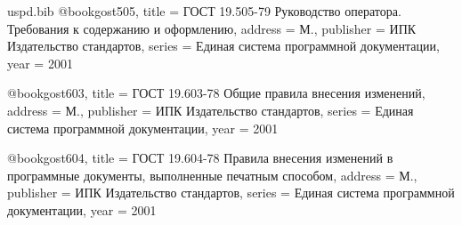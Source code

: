 \begin{filecontents}{uspd.bib}
@book{gost505,
  title = {ГОСТ 19.505-79 Руководство оператора. Требования к содержанию и оформлению},
  address = {М.},
  publisher = {ИПК Издательство стандартов},
  series = {Единая система программной документации},
  year = {2001}
}

@book{gost603,
  title = {ГОСТ 19.603-78 Общие правила внесения изменений},
  address = {М.},
  publisher = {ИПК Издательство стандартов},
  series = {Единая система программной документации},
  year = {2001}
}

@book{gost604,
  title = {ГОСТ 19.604-78 Правила внесения изменений в программные документы, выполненные печатным способом},
  address = {М.},
  publisher = {ИПК Издательство стандартов},
  series = {Единая система программной документации},
  year = {2001}
}

\end{filecontents}

